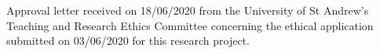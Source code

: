 Approval letter received on 18/06/2020 from the University of St Andrew's Teaching and Research Ethics Committee concerning the ethical application submitted on 03/06/2020 for this research project.

\clearpage
